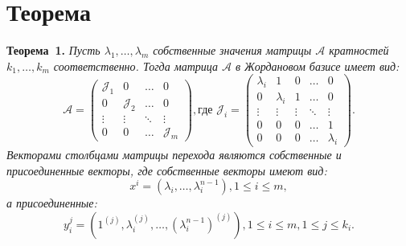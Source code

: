 \section{Теорема}
\textbf{Теорема~1.}
{ \it Пусть $\lambda_1, \ldots , \lambda_m$ собственные значения матрицы $\mathcal{A}$ кратностей $k_1, \ldots , k_m$ соответственно. Тогда матрица $\mathcal{A}$ в Жордановом базисе имеет вид:
$$
	\mathcal{A} = \begin{pmatrix}
		\mathcal{J}_1 & 0 & \dots & 0 \\
		0 & \mathcal{J}_2 & \dots & 0 \\
		\vdots & \vdots & \ddots & \vdots \\
		0 & 0 & \dots & \mathcal{J}_m
	\end{pmatrix}, {\text{где }}
	\mathcal{J}_i = \begin{pmatrix}
		\lambda_i & 1 & 0 & \dots & 0 \\
		0 & \lambda_i & 1 & \dots & 0 \\
		\vdots & \vdots & \vdots & \ddots & \vdots \\
		0 & 0 & 0 & \dots & 1 \\
		0 & 0 & 0 & \dots & \lambda_i
	\end{pmatrix}.
$$
Векторами столбцами матрицы перехода являются собственные и присоединенные векторы, где собственные векторы имеют вид: 
$$x^i =(\lambda_i, \ldots, \lambda_i^{n-1}), 1 \leqslant i \leqslant m,$$
а присоединенные:
$$y_i^j = (1^{(j)}, \lambda_i^{(j)}, \ldots , (\lambda_i^{n-1})^{(j)}), 1 \leqslant i \leqslant m, 1 \leqslant j \leqslant k_i.$$} 


